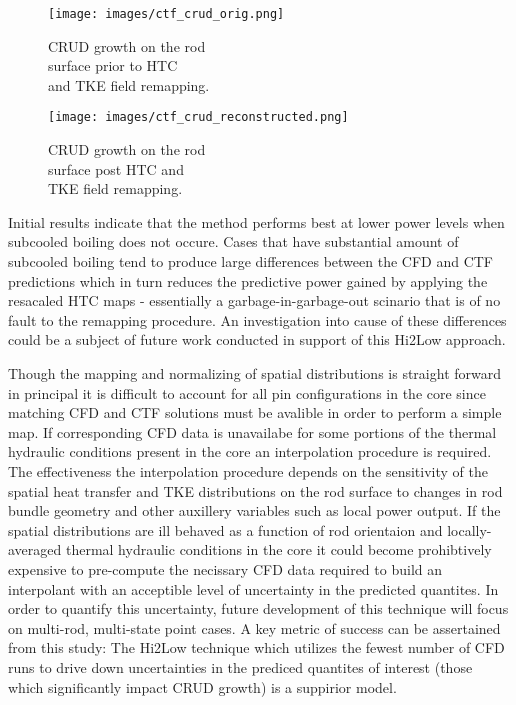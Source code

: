 \begin{figure}[!htbp]
\centering
\begin{minipage}{.45\textwidth}
  \texttt{[image: images/ctf\_crud\_orig.png]}
\caption{CRUD growth on the rod \\ surface prior to HTC \\ and TKE field remapping.}
\label{fig:crud_pre_map}
\end{minipage}%
\begin{minipage}{.45\textwidth}
  \texttt{[image: images/ctf\_crud\_reconstructed.png]}
\caption{CRUD growth on the rod \\ surface post HTC and \\ TKE field remapping.}
\label{fig:crud_post_map}
\end{minipage}
\end{figure}

Initial results indicate that the method performs best at lower power levels when subcooled boiling does not occure.  Cases that have substantial amount of subcooled boiling tend to produce large differences between the CFD and CTF predictions which in turn reduces the predictive power gained by applying the resacaled HTC maps - essentially a garbage-in-garbage-out scinario that is of no fault to the remapping procedure.  An investigation into cause of these differences could be a subject of future work conducted in support of this Hi2Low approach.  

Though the mapping and normalizing of spatial distributions is straight forward in principal it is difficult to account for all pin configurations in the core since matching CFD and CTF solutions must be avalible in order to perform a simple map.  If corresponding CFD data is unavailabe for some portions of the thermal hydraulic conditions present in the core an interpolation procedure is required.  The effectiveness the interpolation procedure depends on the sensitivity of the spatial heat transfer and TKE distributions on the rod surface to changes in rod bundle geometry and other auxillery variables such as local power output.  If the spatial distributions are ill behaved as a function of rod orientaion and locally-averaged thermal hydraulic conditions in the core it could become prohibtively expensive to pre-compute the necissary CFD data required to build an interpolant with an acceptible level of uncertainty in the predicted quantites.  In order to quantify this uncertainty, future development of this technique will focus on multi-rod, multi-state point cases.
A key metric of success can be assertained from this study:  The Hi2Low technique which utilizes the fewest number of CFD runs to drive down uncertainties in the prediced quantites of interest (those which significantly impact CRUD growth) is a suppirior model.

